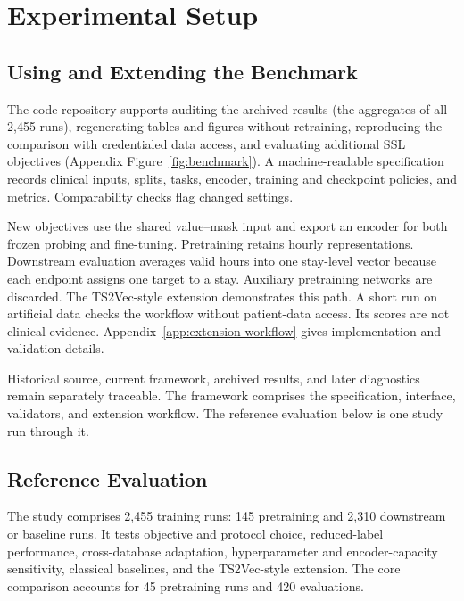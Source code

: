 \section{Experimental Setup}
\label{sec:setup}

\subsection{Using and Extending the Benchmark}
\label{sec:resource}

The code repository supports auditing the archived results (the aggregates of all 2,455 runs), regenerating tables and figures without retraining, reproducing the comparison with credentialed data access, and evaluating additional SSL objectives (Appendix Figure~\ref{fig:benchmark}). A machine-readable specification records clinical inputs, splits, tasks, encoder, training and checkpoint policies, and metrics. Comparability checks flag changed settings.

New objectives use the shared value--mask input and export an encoder for both frozen probing and fine-tuning. Pretraining retains hourly representations. Downstream evaluation averages valid hours into one stay-level vector because each endpoint assigns one target to a stay. Auxiliary pretraining networks are discarded. The TS2Vec-style extension demonstrates this path. A short run on artificial data checks the workflow without patient-data access. Its scores are not clinical evidence. Appendix~\ref{app:extension-workflow} gives implementation and validation details.

Historical source, current framework, archived results, and later diagnostics remain separately traceable. The framework comprises the specification, interface, validators, and extension workflow. The reference evaluation below is one study run through it.

\subsection{Reference Evaluation}

The study comprises 2,455 training runs: 145 pretraining and 2,310 downstream or baseline runs. It tests objective and protocol choice, reduced-label performance, cross-database adaptation, hyperparameter and encoder-capacity sensitivity, classical baselines, and the TS2Vec-style extension. The core comparison accounts for 45 pretraining runs and 420 evaluations.


